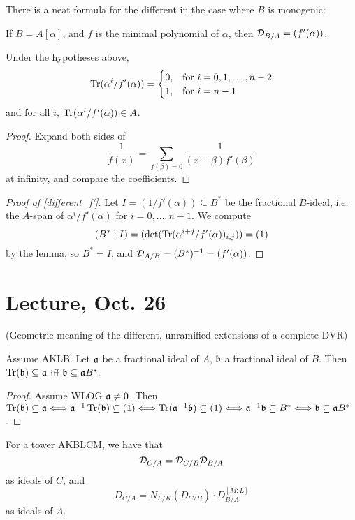 \documentclass[11pt]{amsart}
\begin{document}
There is a neat formula for the different in the case where $B$ is monogenic:

\begin{prop}
\label{different_f'}
If $B = A[\alpha]$, and $f$ is the minimal polynomial of $\alpha$, then $\mathcal{D}_{B/A} = (f'(\alpha))$.
\end{prop}


\begin{lem}
Under the hypotheses above,
\[\operatorname{Tr}(\alpha^i/f'(\alpha)) = \begin{cases}
0, & \text{for } i=0,1,\dots,n-2\\
1, & \text{for } i=n-1
\end{cases}\]
and for all $i$, $\operatorname{Tr}(\alpha^i/f'(\alpha))\in A$.
\end{lem}

\begin{proof}
Expand both sides of
\[\frac{1}{f(x)} = \sum_{f(\beta) = 0} \frac{1}{(x-\beta)f'(\beta)}\]
at infinity, and compare the coefficients.
\end{proof}

\begin{proof}[Proof of \ref{different_f'}]
Let $I = (1/f'(\alpha)) \subseteq B^*$ be the fractional $B$-ideal, i.e. the $A$-span of $\alpha^i/f'(\alpha)$ for $i=0,\dots,n-1$. We compute
\[(B^*: I) = (\det(\operatorname{Tr}(\alpha^{i+j}/f'(\alpha))_{i,j})) = (1)\]
by the lemma, so $B^* = I$, and $\mathcal{D}_{A/B} = (B^*)^{-1} = (f'(\alpha))$.
\end{proof}

\section{Lecture, Oct. 26}

(Geometric meaning of the different, unramified extensions of a complete DVR)

\begin{lem}
Assume AKLB. Let $\mathfrak{a}$ be a fractional ideal of $A$, $\mathfrak{b}$ a fractional ideal of $B$. Then $\operatorname{Tr}(\mathfrak{b}) \subseteq \mathfrak{a}$ iff $\mathfrak{b} \subseteq \mathfrak{a} B^*$.
\end{lem}

\begin{proof}
Assume WLOG $\mathfrak{a}\neq 0$. Then $\operatorname{Tr}(\mathfrak{b}) \subseteq \mathfrak{a} \Longleftrightarrow \mathfrak{a}^{-1}\operatorname{Tr}(\mathfrak{b}) \subseteq (1) \Longleftrightarrow \operatorname{Tr}(\mathfrak{a}^{-1}\mathfrak{b}) \subseteq (1) \Longleftrightarrow \mathfrak{a}^{-1}\mathfrak{b} \subseteq B^* \Longleftrightarrow \mathfrak{b}\subseteq \mathfrak{a} B^*$.
\end{proof}

\begin{prop}
For a tower AKBLCM, we have that
\[\mathcal{D}_{C/A} = \mathcal{D}_{C/B}\mathcal{D}_{B/A}\]
as ideals of $C$, and
\[D_{C/A} = N_{L/K}(D_{C/B}) \cdot D_{B/A}^{[M:L]}\]
as ideals of $A$.
\end{prop}
\end{document}
